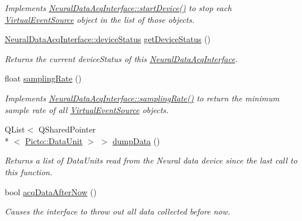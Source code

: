 \begin{DoxyCompactItemize}
\begin{DoxyCompactList}\small\item\em Implements \hyperlink{class_neural_data_acq_interface_afaece5bd061753aa9a4b1e05c0d1e61d}{Neural\-Data\-Acq\-Interface\-::start\-Device()} to stop each \hyperlink{class_virtual_event_source}{Virtual\-Event\-Source} object in the list of those objects. \end{DoxyCompactList}\item 
\hypertarget{class_virtual_device_plugin_a8e80cfda526214a3d183c5c24ba9548b}{\hyperlink{class_neural_data_acq_interface_a18d2ffb89521e40cba91a159e47fd449}{Neural\-Data\-Acq\-Interface\-::device\-Status} \hyperlink{class_virtual_device_plugin_a8e80cfda526214a3d183c5c24ba9548b}{get\-Device\-Status} ()}\label{class_virtual_device_plugin_a8e80cfda526214a3d183c5c24ba9548b}

\begin{DoxyCompactList}\small\item\em Returns the current device\-Status of this \hyperlink{class_neural_data_acq_interface}{Neural\-Data\-Acq\-Interface}. \end{DoxyCompactList}\item 
\hypertarget{class_virtual_device_plugin_ad05755e36d3d4b9afd4d90936d76a56c}{float \hyperlink{class_virtual_device_plugin_ad05755e36d3d4b9afd4d90936d76a56c}{sampling\-Rate} ()}\label{class_virtual_device_plugin_ad05755e36d3d4b9afd4d90936d76a56c}

\begin{DoxyCompactList}\small\item\em Implements \hyperlink{class_neural_data_acq_interface_ab5de05e0b1bd90ac37d0fd7e317e85e3}{Neural\-Data\-Acq\-Interface\-::sampling\-Rate()} to return the minimum sample rate of all \hyperlink{class_virtual_event_source}{Virtual\-Event\-Source} objects. \end{DoxyCompactList}\item 
Q\-List$<$ Q\-Shared\-Pointer\\*
$<$ \hyperlink{class_picto_1_1_data_unit}{Picto\-::\-Data\-Unit} $>$ $>$ \hyperlink{class_virtual_device_plugin_af350fb193b7948691aa36b32d1e9a4ef}{dump\-Data} ()
\begin{DoxyCompactList}\small\item\em Returns a list of Data\-Units read from the Neural data device since the last call to this function. \end{DoxyCompactList}\item 
bool \hyperlink{class_virtual_device_plugin_af7891e45e88097d17e3de1cb71cbbf0c}{acq\-Data\-After\-Now} ()
\begin{DoxyCompactList}\small\item\em Causes the interface to throw out all data collected before now. \end{DoxyCompactList}\end{DoxyCompactItemize}
